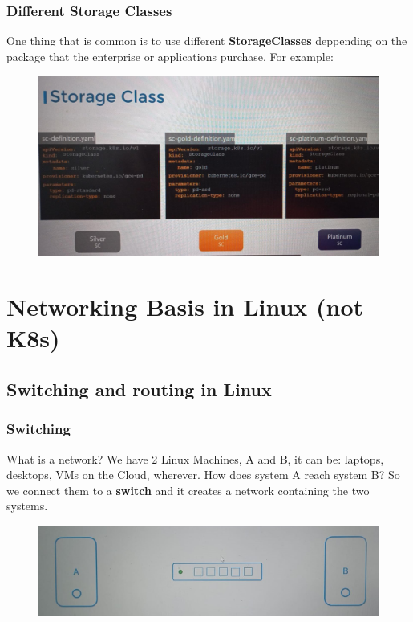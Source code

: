 \documentclass{article}
\begin{document}
\subsubsection{Different Storage Classes}
One thing that is common is to use different \textbf{StorageClasses} deppending on the package that the enterprise or applications purchase. For example:

\begin{figure}[H]
    \includegraphics[width=\textwidth]{pictures/stcl.png}
\end{figure}

\newpage
\section{Networking Basis in Linux (not K8s)}

\subsection{Switching and routing in Linux}
\label{swrt}

\subsubsection{Switching}

What is a network? We have 2 Linux Machines, A and B, it can be: laptops, desktops, VMs on the Cloud, wherever. How does system A reach system B? So we connect them to a \textbf{switch} and it creates a network containing the two systems. 

\begin{figure}[H]
    \includegraphics[width=\textwidth]{pictures/ntw.jpg}
\end{figure}
\end{document}
